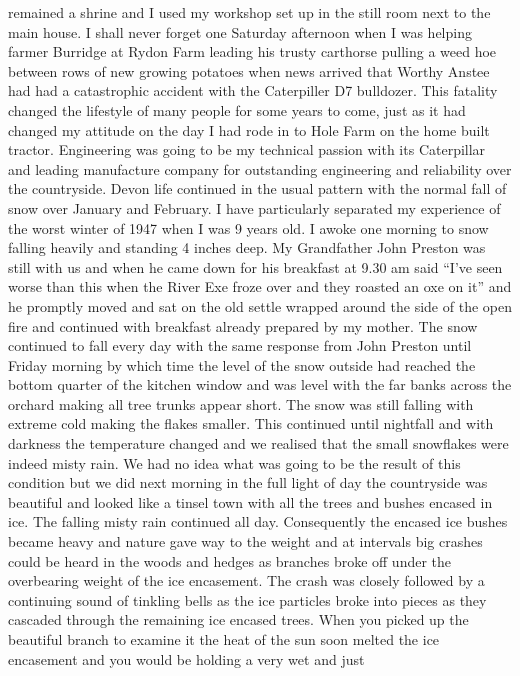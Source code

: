 remained a shrine and I used my workshop set up in the still room next to the
main house. I shall never forget one Saturday afternoon when I was helping
farmer Burridge at Rydon Farm leading his trusty carthorse pulling a weed hoe
between rows of new growing potatoes when news arrived that Worthy Anstee had
had a catastrophic accident with the Caterpiller D7 bulldozer. This fatality
changed the lifestyle of many people for some years to come, just as it had
changed my attitude on the day I had rode in to Hole Farm on the home built
tractor. Engineering was going to be my technical passion with its Caterpillar
and leading manufacture company for outstanding engineering and reliability
over the countryside. Devon life continued in the usual pattern with the normal
fall of snow over January and February. I have particularly separated my
experience of the worst winter of 1947 when I was 9 years old. I awoke one
morning to snow falling heavily and standing 4 inches deep. My Grandfather
John Preston was still with us and when he came down for his breakfast at 9.30
am said ``I've seen worse than this when the River Exe froze over and they
roasted an oxe on it'' and he promptly moved and sat on the old settle wrapped
around the side of the open fire and continued with breakfast already prepared
by my mother. The snow continued to fall every day with the same response from
John Preston until Friday morning by which time the level of the snow outside
had reached the bottom quarter of the kitchen window and was level with the far
banks across the orchard making all tree trunks appear short. The snow was
still falling with extreme cold making the flakes smaller. This continued
until nightfall and with darkness the temperature changed and we realised that
the small snowflakes were indeed misty rain. We had no idea what was going to
be the result of this condition but we did next morning in the full light of
day the countryside was beautiful and looked like a tinsel town with all the
trees and bushes encased in ice. The falling misty rain continued all day.
Consequently the encased ice bushes became heavy and nature gave way to the
weight and at intervals big crashes could be heard in the woods and hedges as
branches broke off under the overbearing weight of the ice encasement. The
crash was closely followed by a continuing sound of tinkling bells as the ice
particles broke into pieces as they cascaded through the remaining ice encased
trees. When you picked up the beautiful branch to examine it the heat of the
sun soon melted the ice encasement and you would be holding a very wet and just
